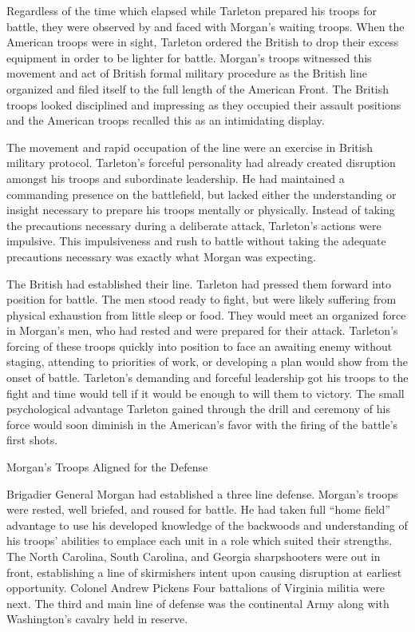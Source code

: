Regardless of the time which elapsed while Tarleton prepared his troops for
battle, they were observed by and faced with Morgan's waiting troops. When the
American troops were in sight, Tarleton ordered the British to drop their
excess equipment in order to be lighter for battle. Morgan's troops witnessed
this movement and act of British formal military procedure as the British line
organized and filed itself to the full length of the American Front. The
British troops looked disciplined and impressing as they occupied their assault
positions and the American troops recalled this as an intimidating display.

The movement and rapid occupation of the line were an exercise in British
military protocol. Tarleton's forceful personality had already created
disruption amongst his troops and subordinate leadership. He had maintained a
commanding presence on the battlefield, but lacked either the understanding or
insight necessary to prepare his troops mentally or physically. Instead of
taking the precautions necessary during a deliberate attack, Tarleton's actions
were impulsive. This impulsiveness and rush to battle without taking the
adequate precautions necessary was exactly what Morgan was expecting.

The British had established their line. Tarleton had pressed them forward into
position for battle. The men stood ready to fight, but were likely suffering
from physical exhaustion from little sleep or food. They would meet an
organized force in Morgan's men, who had rested and were prepared for their
attack. Tarleton's forcing of these troops quickly into position to face an
awaiting enemy without staging, attending to priorities of work, or developing
a plan would show from the onset of battle. Tarleton's demanding and forceful
leadership got his troops to the fight and time would tell if it would be
enough to will them to victory. The small psychological advantage Tarleton
gained through the drill and ceremony of his force would soon diminish in the
American's favor with the firing of the battle's first shots.

Morgan's Troops Aligned for the Defense

Brigadier General Morgan had established a three line defense. Morgan's troops
were rested, well briefed, and roused for battle. He had taken full ``home
field'' advantage to use his developed knowledge of the backwoods and
understanding of his troops' abilities to emplace each unit in a role which
suited their strengths. The North Carolina, South Carolina, and Georgia
sharpshooters were out in front, establishing a line of skirmishers intent upon
causing disruption at earliest opportunity. Colonel Andrew Pickens Four
battalions of Virginia militia were next. The third and main line of defense
was the continental Army along with Washington's cavalry held in reserve.

